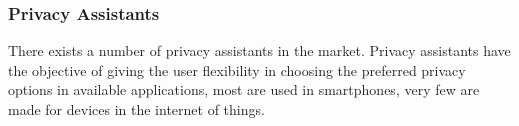 \documentclass[conference]{IEEEtran}
\begin{document}



\subsubsection{Privacy Assistants}

There exists a number of privacy assistants in the market. Privacy assistants
have the objective of giving the user flexibility in choosing the preferred
privacy options in available applications, most are used in smartphones,
very few are made for devices in the internet of things.
\end{document}
